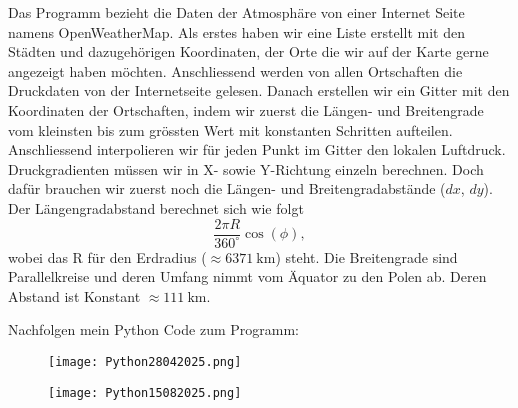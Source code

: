 Das Programm bezieht die Daten der Atmosphäre von einer Internet Seite namens OpenWeatherMap.
Als erstes haben wir eine Liste erstellt mit den Städten und dazugehörigen Koordinaten, der Orte die wir auf der Karte gerne angezeigt haben möchten.
Anschliessend werden von allen Ortschaften die Druckdaten von der Internetseite gelesen.
Danach erstellen wir ein Gitter mit den Koordinaten der Ortschaften, indem wir zuerst die Längen- und Breitengrade vom kleinsten bis zum grössten Wert mit konstanten Schritten aufteilen.
Anschliessend interpolieren wir für jeden Punkt im Gitter den lokalen Luftdruck.
Druckgradienten müssen wir in X- sowie Y-Richtung einzeln berechnen.
Doch dafür brauchen wir zuerst noch die Längen- und Breitengradabstände ($dx$, $dy$).
Der Längengradabstand berechnet sich wie folgt
\begin{equation}
	\frac{2 \pi R}{360^\circ} \cos(\phi), 
\end{equation}
wobei das R für den Erdradius ($\approx\SI{6371}{\kilo\meter}$) steht. 
Die Breitengrade sind Parallelkreise und deren Umfang nimmt vom Äquator zu den Polen ab.
Deren Abstand ist Konstant $\approx\SI{111}{\kilo\meter}$.


Nachfolgen mein Python Code zum Programm:


\begin{figure}
	\centering
	\texttt{[image: Python28042025.png]}
	\caption{}
	\label{bild:28042025}
\end{figure}

\begin{figure}
	\centering
	\texttt{[image: Python15082025.png]}
	\caption{}
	\label{bild:15082025}
\end{figure}


